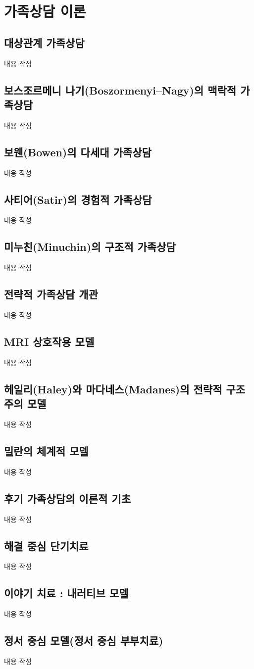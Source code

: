 \section{가족상담 이론}

\subsection{대상관계 가족상담}
내용 작성

\subsection{보스조르메니 나기(Boszormenyi–Nagy)의 맥락적 가족상담}
내용 작성

\subsection{보웬(Bowen)의 다세대 가족상담}
내용 작성

\subsection{사티어(Satir)의 경험적 가족상담}
내용 작성

\subsection{미누친(Minuchin)의 구조적 가족상담}
내용 작성

\subsection{전략적 가족상담 개관}
내용 작성

\subsection{MRI 상호작용 모델}
내용 작성

\subsection{헤일리(Haley)와 마다네스(Madanes)의 전략적 구조주의 모델}
내용 작성

\subsection{밀란의 체계적 모델}
내용 작성

\subsection{후기 가족상담의 이론적 기초}
내용 작성

\subsection{해결 중심 단기치료}
내용 작성

\subsection{이야기 치료 : 내러티브 모델}
내용 작성

\subsection{정서 중심 모델(정서 중심 부부치료)}
내용 작성
